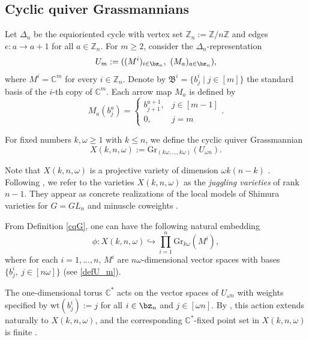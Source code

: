 \documentclass[10pt, a4paper, reqno]{amsart}
\begin{document}
\subsection{Cyclic quiver Grassmannians}\label{ss:cqG}
Let $\Delta_n$ be the equioriented cycle with vertex set $\mathbb{Z}_n:=\mathbb{Z}/n\mathbb{Z}$ and edges $e: a\to a+1$ for all $a\in \mathbb{Z}_n$. For $m\geq 2$, consider the $\Delta_n$-representation
\begin{equation}\label{defU_m}
	U_m := ((M^{i})_{i\in \bz_n},~(M_a)_{a\in \bz_n}),
\end{equation}
where $M^i=\mathbb{C}^m$ for every $i\in \mathbb{Z}_n$. Denote by $\mathfrak{B}^i=\{b_j^i \mid j\in[m]\}$ the standard basis of the $i$-th copy of $\mathbb{C}^m$. Each arrow map $M_a$ is defined by
\[M_a(b^a_j)=\begin{cases}
	b^{a+1}_{j+1}, & j\in[m-1]\\
	0,&j=m
\end{cases}.\]

\begin{defe}\label{cqG}
For fixed numbers $k,\omega\geq 1$ with $k\leq n$, we define the cyclic 
 quiver Grassmannian \[X(k,n,\omega):= \mbox{Gr}_{(k\omega,\ldots,k\omega)}(U_{\omega n}).\]
\end{defe}

\begin{rema}
Note that $X(k,n,\omega)$ is a projective variety of dimension $\omega k(n-k)$ \cite[Lemma 4.9]{p22}. Following \cite{Knutson}, we refer to the varieties $X(k,n,\omega)$ as the \emph{juggling varieties} of rank $n-1$. They appear as concrete realizations of the local models of Shimura varieties for $G=GL_n$ and minuscle coweights \cite[Section 7.1]{prs}.
\end{rema}

\begin{rema}\label{embed-qG-to-Gr}
	From Definition \ref{cqG}, one can have the following natural embedding 
	\begin{equation}
	\phi:	X(k,n,\omega)\hookrightarrow \prod_{i=1}^{n} \mbox{Gr}_{k\omega} (M^i),
	\end{equation}
	where for each $i=1,\ldots,n$, $M^i$ are $n\omega$-dimensional vector spaces with bases $\{b^i_j,~j\in[n\omega]\}$ (see \eqref{defU_m}).
\end{rema}

The one-dimensional torus $\mathbb{C}^*$ acts on the vector spaces of $U_{\omega n}$ with weights specified by
$\mbox{wt}(b_j^i):=j$ for all $i\in\bz_n$ and $j\in [\omega n]$. 
By \cite[Lemma 1.1]{cer11}, this action extends naturally to $X(k,n,\omega)$, and the corresponding $\mathbb{C}^*$-fixed point set in $X(k,n,\omega)$ is finite \cite[Theorem 1]{cer11}. 
\end{document}
